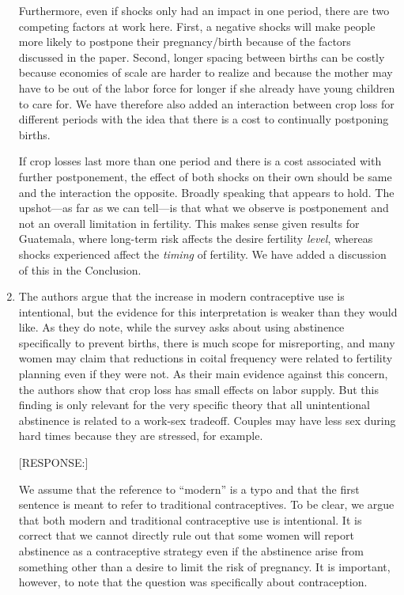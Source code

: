 \documentclass[letterpaper,12pt]{article}
\begin{document}
\begin{enumerate}
Furthermore, even if shocks only had an impact in one period, 
there are two competing factors at work here.
First, a negative shocks will make people more likely to postpone 
their pregnancy/birth because of the factors discussed in the
paper.
Second, longer spacing between births can be costly because economies
of scale are harder to realize and because the mother may have to 
be out of the labor force for longer if she already have young
children to care for.
We have therefore also added an interaction between crop loss for 
different periods with the idea that there is a cost to continually 
postponing births. 

If crop losses last more than one period and there is a cost 
associated with further postponement, the effect of both shocks 
on their own should be same and the interaction the opposite. 
Broadly speaking that appears to hold. 
The upshot---as far as we can tell---is that what we observe is 
postponement and not an overall limitation in fertility. 
This makes sense given results for Guatemala, where long-term risk 
affects the desire fertility \emph{level}, whereas shocks experienced 
affect the \emph{timing} of fertility. 
We have added a discussion of this in the Conclusion.

\item The authors argue that the increase in modern contraceptive use is
intentional, but the evidence for this interpretation is weaker than
they would like. As they do note, while the survey asks about using
abstinence specifically to prevent births, there is much scope for
misreporting, and many women may claim that reductions in coital
frequency were related to fertility planning even if they were not. As
their main evidence against this concern, the authors show that crop
loss has small effects on labor supply. But this finding is only
relevant for the very specific theory that all unintentional abstinence
is related to a work-sex tradeoff. Couples may have less sex during hard
times because they are stressed, for example.

[RESPONSE:] 


We assume that the reference to ``modern'' is a typo and that the
first sentence is meant to refer to traditional contraceptives.
To be clear, we argue that both modern and traditional contraceptive
use is intentional.
It is correct that we cannot directly rule out that some women will 
report abstinence as a contraceptive strategy even if the abstinence 
arise from something other than a desire to limit the risk of pregnancy.
It is important, however, to note that the question was specifically
about contraception.


\end{enumerate}
\end{document}

